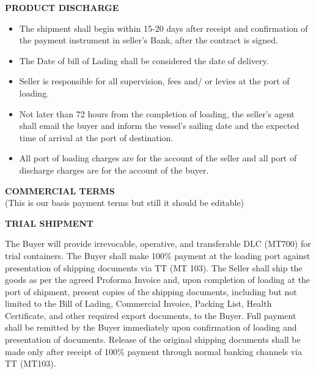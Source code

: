 \documentclass[a4paper,11pt]{article}
\begin{document}
\vspace{0.3cm}

\begin{center}{\large\textbf{\color{marooncolor}PRODUCT DISCHARGE}}\end{center}
\vspace{0.1cm}
\begin{itemize}[leftmargin=1.5em, itemsep=2pt, topsep=2pt]
\item The shipment shall begin within 15-20 days after receipt and confirmation of the payment instrument in seller's Bank, after the contract is signed.
\item The Date of bill of Lading shall be considered the date of delivery.
\item Seller is responsible for all supervision, fees and/ or levies at the port of loading.
\item Not later than 72 hours from the completion of loading, the seller's agent shall email the buyer and inform the vessel's sailing date and the expected time of arrival at the port of destination.
\item All port of loading charges are for the account of the seller and all port of discharge charges are for the account of the buyer.
\end{itemize}

\newpage

\begin{center}
  {\large\textbf{\color{marooncolor}COMMERCIAL TERMS}}\\[4pt]
  {\small\color{marooncolor}(This is our basis payment terms but still it should be editable)}
\end{center}
\vspace{0.2cm}

\begin{center}{\large\textbf{\color{marooncolor}TRIAL SHIPMENT}}\end{center}
\vspace{0.1cm}
\noindent The Buyer will provide irrevocable, operative, and transferable DLC (MT700) for trial containers. The Buyer shall make 100\% payment at the loading port against presentation of shipping documents via TT (MT 103). The Seller shall ship the goods as per the agreed Proforma Invoice and, upon completion of loading at the port of shipment, present copies of the shipping documents, including but not limited to the Bill of Lading, Commercial Invoice, Packing List, Health Certificate, and other required export documents, to the Buyer. Full payment shall be remitted by the Buyer immediately upon confirmation of loading and presentation of documents. Release of the original shipping documents shall be made only after receipt of 100\% payment through normal banking channels via TT (MT103).
\end{document}
